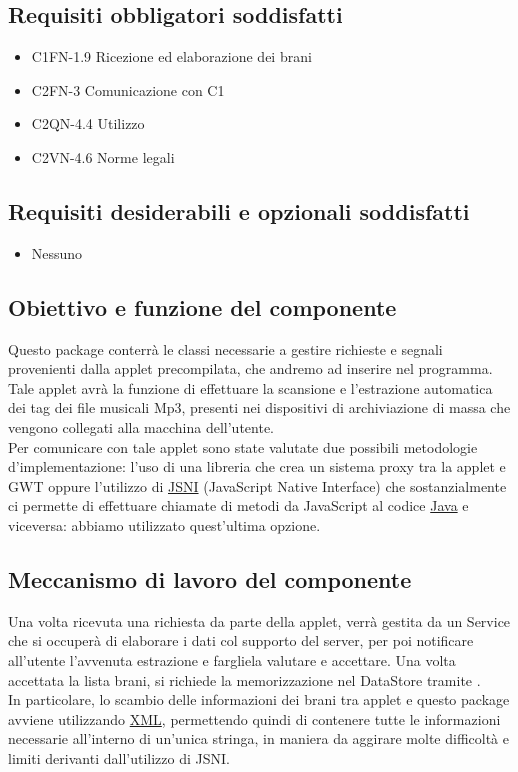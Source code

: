 \subsection*{Requisiti obbligatori soddisfatti}
\begin{itemize}
    \item C1FN-1.9 Ricezione ed elaborazione dei brani
    \item C2FN-3 Comunicazione con C1
    \item C2QN-4.4 Utilizzo
    \item C2VN-4.6 Norme legali
\end{itemize}
\subsection*{Requisiti desiderabili e opzionali soddisfatti}
\begin{itemize}
    \item Nessuno
\end{itemize}
\subsection*{Obiettivo e funzione del componente}
Questo package conterr\`a le classi necessarie a gestire richieste e segnali
provenienti dalla applet precompilata, che andremo ad inserire nel programma.
Tale applet avr\`a la funzione di effettuare la scansione e l'estrazione
automatica dei tag dei file musicali Mp3, presenti nei dispositivi di
archiviazione di massa che vengono collegati alla macchina dell'utente.\\
Per comunicare con tale applet sono state valutate due possibili metodologie
d'implementazione: l'uso di una libreria che crea un sistema proxy tra la applet
e GWT oppure l'utilizzo di \underline{JSNI} (JavaScript Native Interface) che
sostanzialmente ci permette di effettuare chiamate di metodi da JavaScript al
codice \underline{Java} e viceversa: abbiamo utilizzato quest'ultima opzione.
\subsection*{Meccanismo di lavoro del componente}
Una volta ricevuta una richiesta da parte della applet, verr\`a gestita da un
Service che si occuper\`a di elaborare i dati col supporto del server, per poi
notificare all'utente l'avvenuta estrazione e fargliela valutare e accettare.
Una volta accettata la lista brani, si richiede la memorizzazione nel DataStore
tramite .\\
In particolare, lo scambio delle informazioni dei brani tra applet e questo
package avviene utilizzando \underline{XML}, permettendo quindi di contenere
tutte le informazioni necessarie all'interno di un'unica stringa, in maniera da
aggirare molte difficolt\`a e limiti derivanti dall'utilizzo di JSNI.
